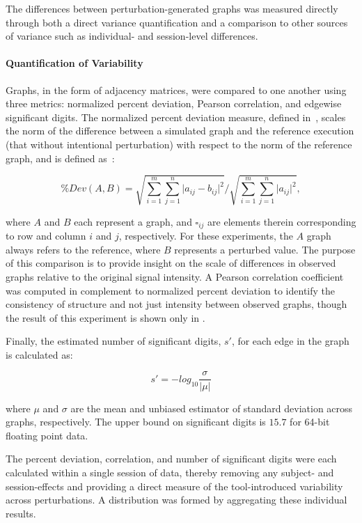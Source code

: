\documentclass[10pt,letterpaper]{article}
\begin{document}
The differences between perturbation-generated graphs was measured directly through
both a direct variance quantification and a comparison to other sources of variance
such as individual- and session-level differences.

\paragraph{Quantification of Variability}
Graphs, in the form of adjacency matrices, were compared to one another using three
metrics: normalized percent deviation, Pearson correlation, and edgewise significant
digits. The normalized percent deviation measure, defined in~\cite{Kiar2020-lb},
scales the norm of the difference between a simulated graph and the reference
execution (that without intentional perturbation) with respect to the norm of the
reference graph, and is defined as~\cite{Kiar2020-lb}:

\begin{equation}
\% Dev (A, B) = \sqrt{\sum_{i=1}^m\sum_{j=1}^n \lvert a_{ij} - b_{ij} \rvert^2 } / \sqrt{\sum_{i=1}^m\sum_{j=1}^n \lvert a_{ij} \rvert^2},
\label{eq:eval}
\end{equation}

where $A$ and $B$ each represent a graph, and $\square_{ij}$ are elements therein
corresponding to row and column $i$ and $j$, respectively. For these experiments,
the $A$ graph always refers to the reference, where $B$ represents a perturbed value. 
The purpose of this comparison is to provide insight on the scale of differences in
observed graphs relative to the original signal intensity. A Pearson correlation
coefficient~\cite{Benesty2009-cb} was computed in complement to normalized percent
deviation to identify the consistency of structure and not just intensity between
observed graphs, though the result of this experiment is shown only in
.

Finally, the estimated number of significant digits, $s'$, for each edge in the graph 
is calculated as:

\begin{equation}
s' = -log_{10}\frac{\sigma}{\lvert\mu\rvert}
\label{eq:sigdig}
\end{equation}

where $\mu$ and $\sigma$ are the mean and unbiased estimator of standard deviation
across graphs, respectively. The upper bound on significant digits is $15.7$ for
64-bit floating point data.

The percent deviation, correlation, and number of significant digits were each
calculated within a single session of data, thereby removing any subject- and
session-effects and providing a direct measure of the tool-introduced variability
across perturbations. A distribution was formed by aggregating these individual
results.
\end{document}
